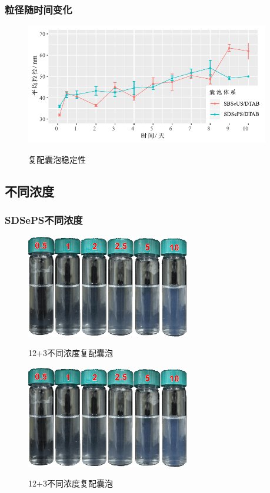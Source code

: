 \documentclass[bachelor,fandolfonts,replaceperiod]{jnuthesis}
\begin{document}
    \subsubsection{粒径随时间变化}
    \begin{figure}[htbp]
        \centering
        \includegraphics[width=0.95\textwidth]{figure/vesicle-time-stability.pdf}\\
        \caption{复配囊泡稳定性}\label{fig:vesicle-time-stability}
    \end{figure}

    \subsection{不同浓度}
    \subsubsection{SDSePS不同浓度}
    \begin{figure}[htbp]
        \centering
        \includegraphics[height=4.5cm]{figure/SDSePS-concentration.png}\\
        \caption{12+3不同浓度复配囊泡}\label{fig:vesicle-SDSePS-concentration}
    \end{figure}

    \begin{figure}[htbp]
        \centering
        \includegraphics[height=4.5cm]{figure/SDSePS-concentration.png}\\
        \caption{12+3不同浓度复配囊泡}\label{fig:vesicle-SDSePS-concentration-line}
    \end{figure}
\end{document}
